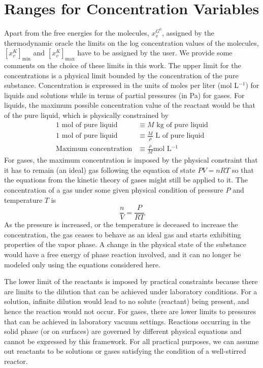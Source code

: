 \section{Ranges for Concentration Variables}\label{second appendix}

Apart from the free energies for the molecules, $x^{G^0}_v$, assigned by the thermodynamic oracle the limits on the log concentration values of the molecules, $\left[x^K_v\right]_{\text{min}}$ and $\left[x^K_v\right]_{\text{max}}$ have to be assigned by the user. We provide some comments on the choice of these limits in this work. 
The upper limit for the concentrations is a physical limit bounded by the concentration of the pure substance. Concentration is expressed in the units of moles per liter (mol L$^{-1}$) for liquids and solutions while in terms of partial pressures (in Pa) for gases. For liquids, the maximum possible concentration value of the reactant would be that of the pure liquid, which is physically constrained by
\begin{align*}
    1 \text{ mol of pure liquid} &\equiv M \text{ kg of pure liquid} \\
    1 \text{ mol of pure liquid} &\equiv \frac{M}{\rho} \text{ L of pure liquid} \\
    \text{Maximum concentration} &\equiv \frac{\rho}{M} \text{mol L$^{-1}$}
\end{align*}
For gases, the maximum concentration is imposed by the physical constraint that it has to remain (an ideal) gas following the equation of state $PV = nRT$ so that the equations from the kinetic theory of gases might still be applied to it. The concentration of a gas under some given physical condition of pressure $P$ and temperature $T$ is
\begin{equation*}
    \frac{n}{V} = \frac{P}{RT}
\end{equation*}
As the pressure is increased, or the temperature is deceased to increase the concentration, the gas ceases to behave as an ideal gas and starts exhibiting properties of the vapor phase. A change in the physical state of the substance would have a free energy of phase reaction involved, and it can no longer be modeled only using the equations considered here. 

The lower limit of the reactants is imposed by practical constraints because there are limits to the dilution that can be achieved under laboratory conditions. For a solution, infinite dilution would lead to no solute (reactant) being present, and hence the reaction would not occur. For gases, there are lower limits to pressures that can be achieved in laboratory vacuum settings. Reactions occurring in the solid phase (or on surfaces) are governed by different physical equations and cannot be expressed by this framework. For all practical purposes, we can assume out reactants to be solutions or gases satisfying the condition of a well-stirred reactor.

